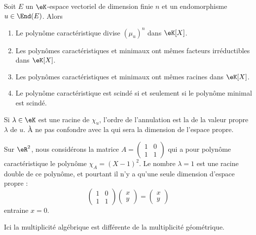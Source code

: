 \begin{theorem}     \label{ThoNhbrUL}
    Soit \( E\) un \(\eK\)-espace vectoriel de dimension finie \( n\) et un endomorphisme \( u\in\End(E)\). Alors
    \begin{enumerate}
        \item
            Le polynôme caractéristique divise \( (\mu_u)^n\) dans \(\eK[X]\).
        \item
            Les polynômes caractéristiques et minimaux ont mêmes facteurs irréductibles dans \(\eK[X]\).
        \item
            Les polynômes caractéristiques et minimaux ont mêmes racines dans \(\eK[X]\).
        \item
            Le polynôme caractéristique est scindé si et seulement si le polynôme minimal est scindé.
    \end{enumerate}
\end{theorem}

Si \( \lambda\in\eK\) est une racine de \( \chi_u\), l'ordre de l'annulation est la  de la valeur propre \( \lambda\) de \( u\). À ne pas confondre avec la  qui sera la dimension de l'espace propre.

\begin{example} \label{ExICOJcFp}
    Sur \( \eR^2\), nous considérons la matrice \( A=\begin{pmatrix}
        1    &   0    \\ 
        1    &   1    
    \end{pmatrix}\) qui a pour polynôme caractéristique le polynôme \( \chi_A=(X-1)^2\). Le nombre \( \lambda=1\) est une racine double de ce polynôme, et pourtant il n'y a qu'une seule dimension d'espace propre :
    \begin{equation}
        \begin{pmatrix}
            1    &   0    \\ 
            1    &   1    
        \end{pmatrix}\begin{pmatrix}
            x    \\ 
            y    
        \end{pmatrix}=\begin{pmatrix}
            x    \\ 
            y    
        \end{pmatrix}
    \end{equation}
    entraine \( x=0\).

    Ici la multiplicité algébrique est différente de la multiplicité géométrique.
\end{example}

